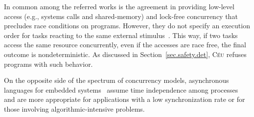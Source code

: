 \documentclass[preprint]{sigplanconf}
\newcommand{\CEU}{\textsc{C\'{e}u}\xspace}
\newcommand{\code}[1] {{\small{\texttt{#1}}}}
\newcommand{\1}{\;}
\newcommand{\2}{\;\;}
\newcommand{\3}{\;\;\;}
\newcommand{\5}{\;\;\;\;\;}
\begin{document}
In common among the referred works is the agreement in providing low-level 
access (e.g., systems calls and shared-memory) and lock-free concurrency that 
precludes race conditions on programs.
However, they do not specify an execution order for tasks reacting to the same 
external stimulus~\cite{esterel.primer,wsn.protothreads,wsn.osm}.
This way, if two tasks access the same resource concurrently, even if the 
accesses are race free, the final outcome is nondeterministic.
As discussed in Section~\ref{sec.safety.det}, \CEU refuses programs with such 
behavior.



On the opposite side of the spectrum of concurrency models, asynchronous 
languages for embedded systems~\cite{wsn.mantisos,arduino.occam}
assume time independence among processes and are more appropriate for 
applications with a low synchronization rate or for those involving
algorithmic-intensive problems.

\end{document}

